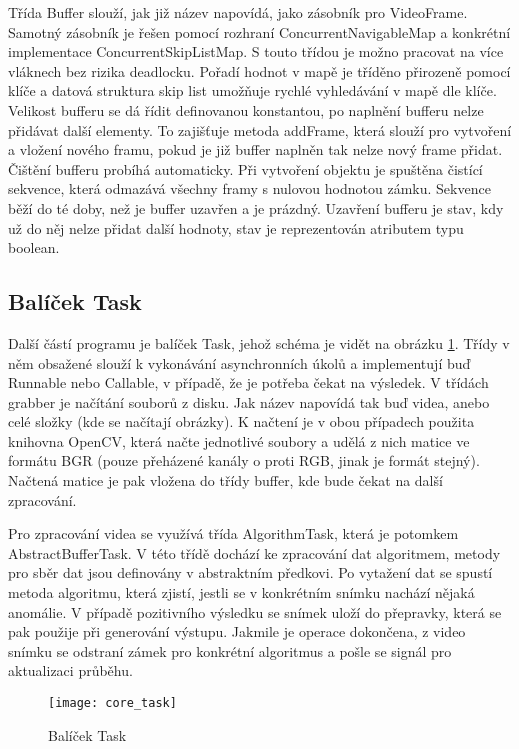Třída Buffer slouží, jak již název napovídá, jako zásobník pro VideoFrame. Samotný zásobník je řešen pomocí rozhraní ConcurrentNavigableMap a konkrétní implementace ConcurrentSkipListMap. S touto třídou je možno pracovat na více vláknech bez rizika deadlocku. Pořadí hodnot v mapě je tříděno přirozeně pomocí klíče a datová struktura skip list umožňuje rychlé vyhledávání v mapě dle klíče. Velikost bufferu se dá řídit definovanou konstantou, po naplnění bufferu nelze přidávat další elementy. To zajišťuje metoda addFrame, která slouží pro vytvoření a vložení nového framu, pokud je již buffer naplněn tak nelze nový frame přidat. Čištění bufferu probíhá automaticky. Při vytvoření objektu je spuštěna čistící sekvence, která odmazává všechny framy s nulovou hodnotou zámku. Sekvence běží do té doby, než je buffer uzavřen a je prázdný. Uzavření bufferu je stav, kdy už do něj nelze přidat další hodnoty, stav je reprezentován atributem typu boolean.

\subsection{Balíček Task}
Další částí programu je balíček Task, jehož schéma je vidět na obrázku \ref{fig:core_task}. Třídy v něm obsažené slouží k vykonávání asynchronních úkolů a implementují buď Runnable nebo Callable, v případě, že je potřeba čekat na výsledek. V třídách grabber je načítání souborů z disku. Jak název napovídá tak buď videa, anebo celé složky (kde se načítají obrázky). K načtení je v obou případech použita knihovna OpenCV, která načte jednotlivé soubory a udělá z nich matice ve formátu BGR (pouze přeházené kanály o proti RGB, jinak je formát stejný). Načtená matice je pak vložena do třídy buffer, kde bude čekat na další zpracování.

Pro zpracování videa se využívá třída AlgorithmTask, která je potomkem AbstractBufferTask. V této třídě dochází ke zpracování dat algoritmem, metody pro sběr dat jsou definovány v abstraktním předkovi. Po vytažení dat se spustí metoda algoritmu, která zjistí, jestli se v konkrétním snímku nachází nějaká anomálie. V případě pozitivního výsledku se snímek uloží do přepravky, která se pak použije při generování výstupu. Jakmile je operace dokončena, z video snímku se odstraní zámek pro konkrétní algoritmus a pošle se signál pro aktualizaci průběhu.

\begin{figure}[h]
	\texttt{[image: core\_task]}
	\centering
	\caption{Balíček Task \label{fig:core_task}}
\end{figure} 
\FloatBarrier

